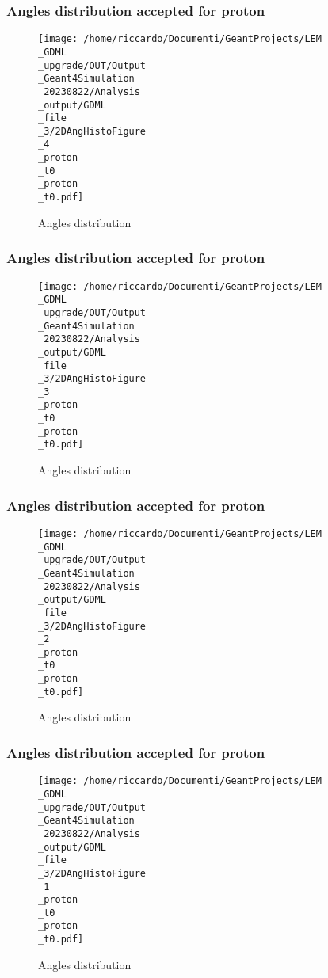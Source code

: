 \documentclass[8pt]{beamer}
\begin{document}
            \begin{frame}
                \frametitle{Angles distribution accepted for proton}
            
        \begin{figure}[h]
            \centering
            \texttt{[image: /home/riccardo/Documenti/GeantProjects/LEM\\\_GDML\\\_upgrade/OUT/Output\\\_Geant4Simulation\\\_20230822/Analysis\\\_output/GDML\\\_file\\\_3/2DAngHistoFigure\\\_4\\\_proton\\\_t0\\\_proton\\\_t0.pdf]}
            \caption{Angles distribution}
        \end{figure}
        
            \end{frame}
            
            \begin{frame}
                \frametitle{Angles distribution accepted for proton}
            
        \begin{figure}[h]
            \centering
            \texttt{[image: /home/riccardo/Documenti/GeantProjects/LEM\\\_GDML\\\_upgrade/OUT/Output\\\_Geant4Simulation\\\_20230822/Analysis\\\_output/GDML\\\_file\\\_3/2DAngHistoFigure\\\_3\\\_proton\\\_t0\\\_proton\\\_t0.pdf]}
            \caption{Angles distribution}
        \end{figure}
        
            \end{frame}
            
            \begin{frame}
                \frametitle{Angles distribution accepted for proton}
            
        \begin{figure}[h]
            \centering
            \texttt{[image: /home/riccardo/Documenti/GeantProjects/LEM\\\_GDML\\\_upgrade/OUT/Output\\\_Geant4Simulation\\\_20230822/Analysis\\\_output/GDML\\\_file\\\_3/2DAngHistoFigure\\\_2\\\_proton\\\_t0\\\_proton\\\_t0.pdf]}
            \caption{Angles distribution}
        \end{figure}
        
            \end{frame}
            
            \begin{frame}
                \frametitle{Angles distribution accepted for proton}
            
        \begin{figure}[h]
            \centering
            \texttt{[image: /home/riccardo/Documenti/GeantProjects/LEM\\\_GDML\\\_upgrade/OUT/Output\\\_Geant4Simulation\\\_20230822/Analysis\\\_output/GDML\\\_file\\\_3/2DAngHistoFigure\\\_1\\\_proton\\\_t0\\\_proton\\\_t0.pdf]}
            \caption{Angles distribution}
        \end{figure}
        
            \end{frame}
            
\end{document}
